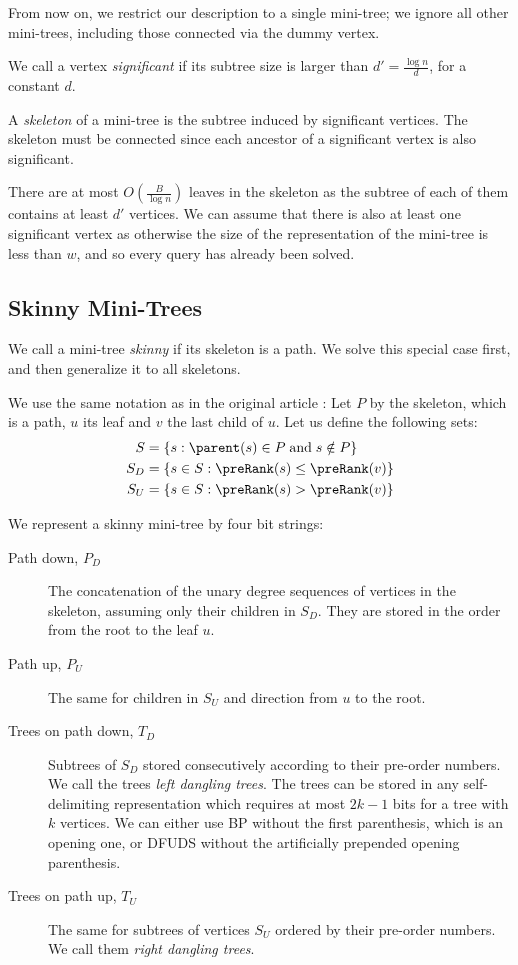 \bigbreak

From now on, we restrict our description to a single mini-tree; we ignore all other mini-trees, including those connected via the dummy vertex.

We call a vertex \emph{significant} if its subtree size is larger than $d' = \frac{\log n}{d}$, for a constant $d$.

A \emph{skeleton} of a mini-tree is the subtree induced by significant vertices.
The skeleton must be connected since each ancestor of a significant vertex is also significant.

There are at most $O(\frac{B}{\log n})$ leaves in the skeleton as the subtree of each of them contains at least $d'$ vertices.
We can assume that there is also at least one significant vertex as otherwise the size of the representation of the mini-tree is less than $w$, and so every query has already been solved.

\subsection{Skinny Mini-Trees}

We call a mini-tree \emph{skinny} if its skeleton is a path.
We solve this special case first, and then generalize it to all skeletons.

We use the same notation as in the original article \cite{farzan2009universal}:
Let $P$ by the skeleton, which is a path, $u$ its leaf and $v$ the last child of $u$.
Let us define the following sets:
\begin{align*}
	S &= \{ s : \parent(s) \in P \booland s \notin P \} \\
	S_D &= \{ s \in S : \preRank(s) \le \preRank(v) \} \\
	S_U &= \{ s \in S : \preRank(s) > \preRank(v) \}
\end{align*}

We represent a skinny mini-tree by four bit strings:
\begin{description}
	\item[Path down, $P_D$]
	The concatenation of the unary degree sequences of vertices in the skeleton, assuming only their children in $S_D$.
	They are stored in the order from the root to the leaf $u$.
	
	\item[Path up, $P_U$]
	The same for children in $S_U$ and direction from $u$ to the root.
	
	\item[Trees on path down, $T_D$]
	Subtrees of $S_D$ stored consecutively according to their pre-order numbers.
	We call the trees \emph{left dangling trees}.
	The trees can be stored in any self-delimiting representation which requires at most $2k - 1$ bits for a tree with $k$ vertices.
	We can either use BP without the first parenthesis, which is an opening one, or DFUDS without the artificially prepended opening parenthesis.
	
	\item[Trees on path up, $T_U$]
	The same for subtrees of vertices $S_U$ ordered by their pre-order numbers.
	We call them \emph{right dangling trees}.
\end{description}

